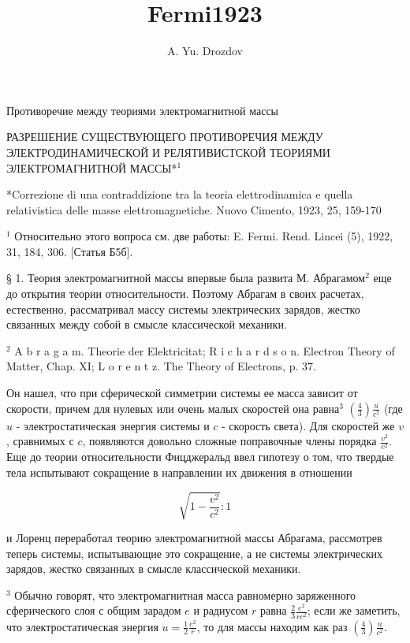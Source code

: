 \documentclass[11pt]{article}
\author{A. Yu. Drozdov}
\title{Fermi1923}
\begin{document}
    
    \maketitle
    
    

    
    Противоречие между теориями электромагнитной массы

    РАЗРЕШЕНИЕ СУЩЕСТВУЮЩЕГО ПРОТИВОРЕЧИЯ МЕЖДУ ЭЛЕКТРОДИНАМИЧЕСКОЙ И
РЕЛЯТИВИСТСКОЙ ТЕОРИЯМИ ЭЛЕКТРОМАГНИТНОЙ МАССЫ*\(^1\)

    *Correzione di una contraddizione tra la teoria elettrodinamica e quella
relativistica delle masse elettromagnetiche. Nuovo Cimento, 1923, 25,
159-170

    \(^1\) Относительно этого вопроса см. две работы: E. Fermi. Rend. Lincei
(5), 1922, 31, 184, 306. {[}Статья Б5б{]}.

    § 1. Теория электромагнитной массы впервые была развита М.
Абрагамом\(^2\) еще до открытия теории относительности. Поэтому Абрагам
в своих расчетах, естественно, рассматривал массу системы электрических
зарядов, жестко связанных между собой в смысле классической механики.

    \(^2\) A b r a g a m. Theorie der Elektricitat; R i c h a r d s o n.
Electron Theory of Matter, Chap. XI; L o r e n t z. The Theory of
Electrons, p. 37.

    Он нашел, что при сферической симметрии системы ее масса зависит от
скорости, причем для нулевых или очень малых скоростей она равна\(^3\)
\(\left(\frac{4}{3}\right) \frac{u}{c^2}\) (где \(u\) -
электростатическая энергия системы и \(c\) - скорость света). Для
скоростей же \(v\), сравнимых с \(c\), появляются довольно сложные
поправочные члены порядка \(\frac{v^2}{c^2}\). Еще до теории
относительности Фицджеральд ввел гипотезу о том, что твердые тела
испытывают сокращение в направлении их движения в отношении

\[\sqrt{1-\frac{v^2}{c^2}}:1\]

    и Лоренц переработал теорию электромагнитной массы Абрагама, рассмотрев
теперь системы, испытывающие это сокращение, а не системы электрических
зарядов, жестко связанных в смысле классической механики.

    \(^3\) Обычно говорят, что электромагнитная масса равномерно заряженного
сферического слоя с общим зарадом \(e\) и радиусом \(r\) равна
\(\frac{2}{3} \frac{e^2}{r c^2}\); если же заметить, что
электростатическая энергия \(u = \frac{1}{2} \frac{e^2}{r}\), то для
массы находим как раз \(\left(\frac{4}{3}\right) \frac{u}{c^2}\).
\end{document}
